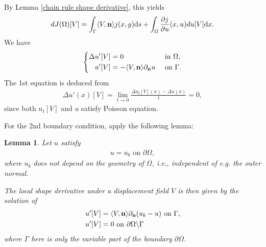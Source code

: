 \documentclass[oneside,11pt]{book}
\numberwithin{equation}{section}
\newtheorem{lemma}{Lemma}[section]
\newtheorem{definition}{Definition}[section]
\begin{document}
%

By Lemma \ref{chain rule shape derivative}, this yields
\begin{align}
    dJ(\Omega)[V] = \int_\Gamma \langle V,{\bf n}\rangle j(x,g){\rm d}s + \int_\Omega \frac{\partial j}{\partial u}(x,u)du[V]{\rm d}x.
\end{align}
We have
\begin{equation*}
    \left\{\begin{split}
        \Delta u'[V] &= 0 &&\mbox{ in } \Omega,\\
        u'[V] &= -\langle V,{\bf n}\rangle\partial_{\bf n}u &&\mbox{ on } \Gamma.
    \end{split}\right.
\end{equation*}
The 1st equation is deduced from
\begin{align}
    \Delta u'(x)[V] = \lim_{t\to 0} \frac{\Delta u_t[V](x) - \Delta u(x)}{t} = 0,
\end{align}
since both $u_t[V]$ and $u$ satisfy Poisson equation.

For the 2nd boundary condition, apply the following lemma:

\begin{lemma}
    \label{Schmidt2020 Lemma 4.40}
    Let $u$ satisfy
    \begin{align}
        u = u_b \mbox{ on } \partial\Omega,
    \end{align}
    where $u_b$ does not depend on the geometry of $\Omega$, i.e., independent of e.g. the outer normal.
    
    The local shape derivative under a displacement field $V$ is then given by the solution of
    \begin{align}
        u'[V] &= \langle V,{\bf n}\rangle\partial_{\bf n}(u_b - u) \mbox{ on } \Gamma,\\
        u'[V] &= 0 \mbox{ on } \partial\Omega\backslash\Gamma
    \end{align}
    where $\Gamma$ here is only the variable part of the boundary $\partial\Omega$.
\end{lemma}
\end{document}
